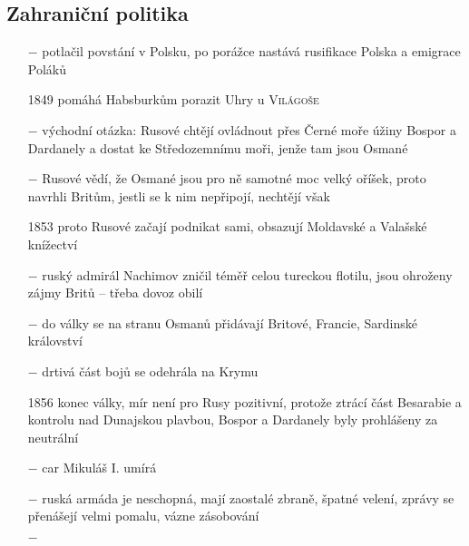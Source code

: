 \documentclass{article}
\begin{document}
\subsection*{Zahraniční politika}
\begin{itemize}
    \vspace{-0.5em}
    \setlength\itemsep{0.15em}
    \item[$-$] potlačil povstání v Polsku, po porážce nastává rusifikace Polska a emigrace Poláků
    \item[1849] pomáhá Habsburkům porazit Uhry u \textsc{Világoše}
    \item[$-$] východní otázka: Rusové chtějí ovládnout přes Černé moře úžiny Bospor a Dardanely a dostat ke Středozemnímu moři, jenže tam jsou Osmané
    \item[$-$] Rusové vědí, že Osmané jsou pro ně samotné moc velký oříšek, proto navrhli Britům, jestli se k nim nepřipojí, nechtějí však
    \item[1853] proto Rusové začají podnikat sami, obsazují Moldavské a Valašské knížectví
    \item[$-$] ruský admirál Nachimov zničil téměř celou tureckou flotilu, jsou ohroženy zájmy Britů -- třeba dovoz obilí
    \item[$-$] do války se na stranu Osmanů přidávají Britové, Francie, Sardinské království
    \item[$-$] drtivá část bojů se odehrála na Krymu
    \item[1856] konec války, mír není pro Rusy pozitivní, protože ztrácí část Besarabie a kontrolu nad Dunajskou plavbou, Bospor a Dardanely byly prohlášeny za neutrální
    \item[$-$] car Mikuláš I. umírá
    \item[$-$] ruská armáda je neschopná, mají zaostalé zbraně, špatné velení, zprávy se přenášejí velmi pomalu, vázne zásobování
    \item[$-$] 
\end{itemize}
\end{document}

